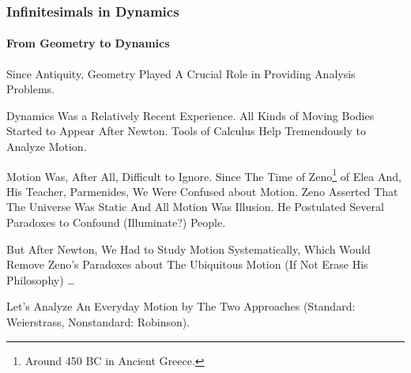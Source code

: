 \begin{frame}
\frametitle{Infinitesimals in Dynamics}
\framesubtitle{From Geometry to Dynamics}
\label{slide:infinitesimals-in-dynamics}
Since Antiquity, Geometry Played A Crucial Role in Providing Analysis Problems.

Dynamics Was a Relatively Recent Experience. All Kinds of \alert{Moving Bodies} Started to Appear After Newton. Tools of Calculus Help Tremendously to Analyze \alert{Motion}.

Motion Was, After All, Difficult to Ignore. Since The Time of Zeno\footnote{Around 450 BC in Ancient Greece.} of Elea And, His Teacher, Parmenides, We Were Confused about Motion. Zeno Asserted That The \alert{Universe Was Static And All Motion Was Illusion}. He Postulated Several Paradoxes to Confound (Illuminate?) People.

But After Newton, We Had to Study Motion Systematically, Which Would \alert{Remove Zeno's Paradoxes about The Ubiquitous Motion} (If Not Erase His Philosophy) \dots

Let's Analyze An Everyday Motion by The Two Approaches (\alert{Standard: Weierstrass, Nonstandard: Robinson}).
\end{frame}
